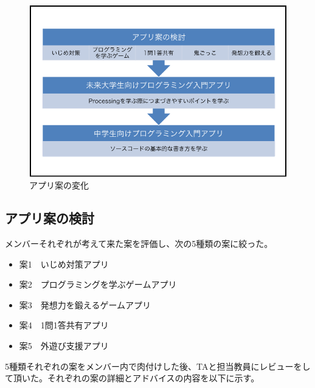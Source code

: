 \documentclass[openany,11pt,papersize]{jsbook}
\begin{document}
\begin{figure}[H]
\begin{center}
\includegraphics[width=12cm, bb=0 0 720 480]{img/appChangeFirstTerm.png}
\end{center}
\caption{アプリ案の変化}
\end{figure}


\subsection{アプリ案の検討}
\par メンバーそれぞれが考えて来た案を評価し、次の5種類の案に絞った。

\begin{itemize}
 \item 案1　いじめ対策アプリ
 \item 案2　プログラミングを学ぶゲームアプリ
 \item 案3　発想力を鍛えるゲームアプリ
 \item 案4　1問1答共有アプリ
 \item 案5　外遊び支援アプリ
\end{itemize}
 
\par 5種類それぞれの案をメンバー内で肉付けした後、TAと担当教員にレビューをして頂いた。それぞれの案の詳細とアドバイスの内容を以下に示す。
\end{document}
